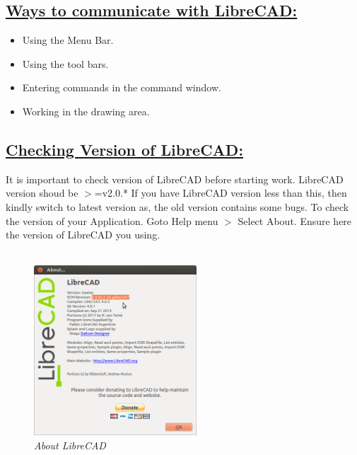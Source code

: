\subsection*{\underline{Ways to communicate with LibreCAD:}}
\begin{itemize}
\item{Using the Menu Bar.}
\item{Using the tool bars.}
\item{Entering commands in the command window.}
\item{Working in the drawing area.}
\end{itemize}
%
\subsection*{\underline{Checking Version of LibreCAD:}}
It is important to check version of LibreCAD before starting work. LibreCAD version shoud be $>$=v2.0.*
If you have LibreCAD version less than this, then kindly switch to latest version as, the old version contains some bugs.
To check the version of your Application. Goto Help menu $>$ Select About. Ensure here the version of LibreCAD you using.\\\\
\begin{figure}[h!]
       \centering\includegraphics[width=230px]{./images/about.png}
       \caption{\small \sl About LibreCAD}
       \end{figure}
